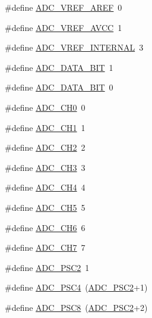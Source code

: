 \begin{DoxyCompactItemize}
\item 
\#define \hyperlink{group__ex4__adc_gabca684824d1a447a7ddb9375efaec794}{A\-D\-C\-\_\-\-V\-R\-E\-F\-\_\-\-A\-R\-E\-F}~0
\item 
\#define \hyperlink{group__ex4__adc_gad8c99ef2e1a54e5ac6ac5f2a46609fdc}{A\-D\-C\-\_\-\-V\-R\-E\-F\-\_\-\-A\-V\-C\-C}~1
\item 
\#define \hyperlink{group__ex4__adc_ga2da1d74b5e84e23e53be679cf9a92ed5}{A\-D\-C\-\_\-\-V\-R\-E\-F\-\_\-\-I\-N\-T\-E\-R\-N\-A\-L}~3
\item 
\#define \hyperlink{group__ex4__adc_gae57d5a32e1a79311452cc1cdcb570614}{A\-D\-C\-\_\-\-D\-A\-T\-A\-\_\-B\-I\-T}~1
\item 
\#define \hyperlink{group__ex4__adc_ga166c1f0adb5ea80087faac7746224568}{A\-D\-C\-\_\-\-D\-A\-T\-A\-\_\-B\-I\-T}~0
\item 
\#define \hyperlink{group__ex4__adc_ga1e33b83bfcf4433eb2e8c6e818b5dff8}{A\-D\-C\-\_\-\-C\-H0}~0
\item 
\#define \hyperlink{group__ex4__adc_ga7d351ed34ca3ff55d1681ee84a243090}{A\-D\-C\-\_\-\-C\-H1}~1
\item 
\#define \hyperlink{group__ex4__adc_ga2bb0c1b2de3aa355244417d9a42a8966}{A\-D\-C\-\_\-\-C\-H2}~2
\item 
\#define \hyperlink{group__ex4__adc_ga6ae98bab335f9d073a58d70e7ba4f844}{A\-D\-C\-\_\-\-C\-H3}~3
\item 
\#define \hyperlink{group__ex4__adc_ga3648bb19b5c3735452fee16c835afc43}{A\-D\-C\-\_\-\-C\-H4}~4
\item 
\#define \hyperlink{group__ex4__adc_ga479d965dae60f80b698f0dd6a348e30a}{A\-D\-C\-\_\-\-C\-H5}~5
\item 
\#define \hyperlink{group__ex4__adc_gaec122320eeb7216887651ef5f1c73442}{A\-D\-C\-\_\-\-C\-H6}~6
\item 
\#define \hyperlink{group__ex4__adc_gaea897f597c4ee7b003920953fb213638}{A\-D\-C\-\_\-\-C\-H7}~7
\item 
\#define \hyperlink{group__ex4__adc_ga17dcbe58ddaee17c0a9240f875c5fafa}{A\-D\-C\-\_\-\-P\-S\-C2}~1
\item 
\#define \hyperlink{group__ex4__adc_ga6c2340ea20750be3852fb32e629a7091}{A\-D\-C\-\_\-\-P\-S\-C4}~(\hyperlink{group__ex4__adc_ga17dcbe58ddaee17c0a9240f875c5fafa}{A\-D\-C\-\_\-\-P\-S\-C2}+1)
\item 
\#define \hyperlink{group__ex4__adc_gaaca57247c775b90985187abd9306e7e2}{A\-D\-C\-\_\-\-P\-S\-C8}~(\hyperlink{group__ex4__adc_ga17dcbe58ddaee17c0a9240f875c5fafa}{A\-D\-C\-\_\-\-P\-S\-C2}+2)

\end{DoxyCompactItemize}
